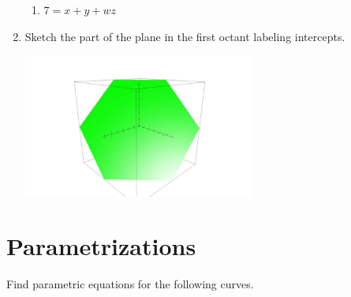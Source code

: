 \documentclass[letter,11pt]{article}
\begin{document}
\begin{enumerate}[label=\Alph*.]
\begin{enumerate}
        \item $7=x+y+wz$
    \end{enumerate}
    \item Sketch the part of the plane in the first octant labeling intercepts.
    \begin{center}
        \includegraphics[width = 3in]{Graph 1.jpg}
    \end{center}
\end{enumerate}

\section{Parametrizations}
Find parametric equations for the following curves.
\end{document}
